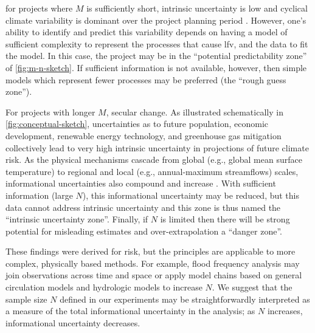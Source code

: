 \documentclass[
  draft,
  linenumbers
]{agujournal2019}
\begin{document}
  for projects where $M$ is sufficiently short, intrinsic uncertainty is low and cyclical climate variability is dominant over the project planning period \citep{Jain:2001hz,Hodgkins:2017hw}.
However, one's ability to identify and predict this variability depends on having a model of sufficient complexity to represent the processes that cause \gls{lfv}, and the data to fit the model.
In this case, the project may be in the ``potential predictability zone'' of \cref{fig:m-n-sketch}.
If sufficient information is not available, however, then simple models which represent fewer processes may be preferred (the ``rough guess zone'').

For projects with longer $M$,   secular change.
As illustrated schematically in \cref{fig:conceptual-sketch}, uncertainties as to future population, economic development, renewable energy technology, and greenhouse gas mitigation collectively lead to very high intrinsic uncertainty in projections of future climate risk.
As the physical mechanisms cascade from global (e.g.\@\xspace, global mean surface temperature) to regional  \citep[e.g.\@\xspace, storm track position;][]{Barnes:2015gl} and local (e.g.\@\xspace, annual-maximum streamflows) scales, informational uncertainties also compound and increase \citep{Dittes:2017he}.
With sufficient information (large $N$), this informational uncertainty may be reduced, but this data cannot address intrinsic uncertainty and this zone is thus named the ``intrinsic uncertainty zone''.
Finally, if $N$ is limited then there will be strong potential for misleading estimates and over-extrapolation \add{(i.e.\xspace} a ``danger zone''.

These findings were derived    for  risk, but the principles are applicable to more complex, physically based methods.
For example, flood frequency analysis may join observations across time and space \citep{Lima:2016kd,Merz:2008eh} or apply model chains based on general circulation models and hydrologic models \citep[see][]{Merz:2014gf} to increase $N$.
We suggest that the sample size $N$ defined in our experiments may be straightforwardly interpreted as a measure of the total informational uncertainty in the analysis; as $N$ increases, informational uncertainty decreases.
\end{document}
